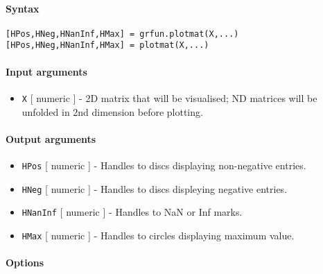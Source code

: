 


	\paragraph{Syntax}\label{syntax}

\begin{verbatim}
[HPos,HNeg,HNanInf,HMax] = grfun.plotmat(X,...)
[HPos,HNeg,HNanInf,HMax] = plotmat(X,...)
\end{verbatim}

\paragraph{Input arguments}\label{input-arguments}

\begin{itemize}
\itemsep1pt\parskip0pt
\item
  \texttt{X} {[} numeric {]} - 2D matrix that will be visualised; ND
  matrices will be unfolded in 2nd dimension before plotting.
\end{itemize}

\paragraph{Output arguments}\label{output-arguments}

\begin{itemize}
\item
  \texttt{HPos} {[} numeric {]} - Handles to discs displaying
  non-negative entries.
\item
  \texttt{HNeg} {[} numeric {]} - Handles to discs displeying negative
  entries.
\item
  \texttt{HNanInf} {[} numeric {]} - Handles to NaN or Inf marks.
\item
  \texttt{HMax} {[} numeric {]} - Handles to circles displaying maximum
  value.
\end{itemize}

\paragraph{Options}\label{options}

